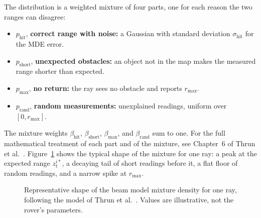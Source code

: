 The distribution is a weighted mixture of four parts, one for each reason the two ranges can
disagree:
\begin{itemize}
  \item $p_{\mathrm{hit}}$, \textbf{correct range with noise:} a Gaussian with standard
    deviation $\sigma_{\mathrm{hit}}$ for the MDE error.
  \item $p_{\mathrm{short}}$, \textbf{unexpected obstacles:} an object not in the map makes the
    measured range shorter than expected.
  \item $p_{\max}$, \textbf{no return:} the ray sees no obstacle and reports $r_{\max}$.
  \item $p_{\mathrm{rand}}$, \textbf{random measurements:} unexplained readings, uniform over
    $[0, r_{\max}]$.
\end{itemize}
The mixture weights $\beta_{\mathrm{hit}}$, $\beta_{\mathrm{short}}$, $\beta_{\max}$, and
$\beta_{\mathrm{rand}}$ sum to one. For the full mathematical treatment of each part and of the
mixture, see Chapter~6 of Thrun et al.~\cite{thrun2005probabilistic}.
Figure~\ref{fig:beam-mixture} shows the typical shape of the mixture for one ray: a peak at the
expected range $z_t^{i*}$, a decaying tail of short readings before it, a flat floor of random
readings, and a narrow spike at $r_{\max}$.

\begin{figure}[htbp]
  \centering
  
  \caption{Representative shape of the beam model mixture density for one ray, following the
    model of Thrun et al.~\cite{thrun2005probabilistic}. Values are illustrative, not the
    rover's parameters.}
  \label{fig:beam-mixture}
\end{figure}

